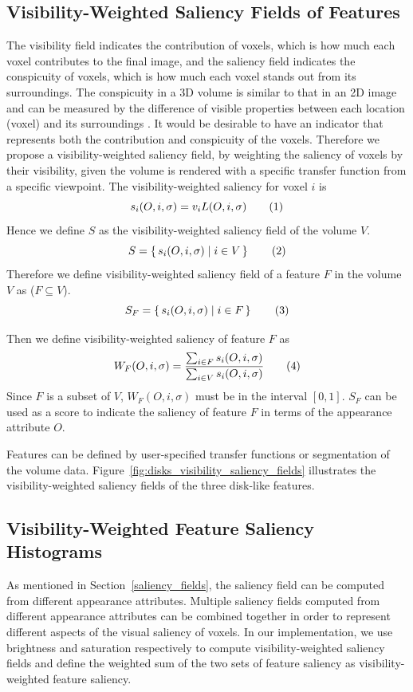 \subsection{Visibility-Weighted Saliency Fields of Features \label{visibility_weighted_saliency}}
The visibility field indicates the contribution of voxels, which is how much each voxel contributes to the final image, and the saliency field indicates the conspicuity of voxels, which is how much each voxel stands out from its surroundings.
The conspicuity in a 3D volume is similar to that in an 2D image and can be measured by the difference of visible properties between each location (voxel) and its surroundings \cite{duan_visual_2011}.
It would be desirable to have an indicator that represents both the contribution and conspicuity of the voxels.
Therefore we propose a visibility-weighted saliency field, by weighting the saliency of voxels by their visibility, given the volume is rendered with a specific transfer function from a specific viewpoint.
The visibility-weighted saliency for voxel $ i $ is
\[ s_{i}(O,i,\sigma)= v_{i} L(O,i,\sigma)
\addtag \]
Hence we define $ S $ as the visibility-weighted saliency field of the volume $ V $.
\[ S=\set{s_{i}(O,i,\sigma)|i \in V} 
\addtag \]
Therefore we define visibility-weighted saliency field of a feature $ F $ in the volume $ V $ as ($ F\subseteq V $).
\[ S_{F}=\set{s_{i}(O,i,\sigma)|i \in F} 
\addtag \]

Then we define visibility-weighted saliency of feature $ F $ as
\[ W_{F}(O,i,\sigma)=\frac{\sum_{i \in F}{s_{i}(O,i,\sigma)}}{\sum_{i \in V}{s_{i}(O,i,\sigma)}} 
\addtag \]
Since $ F $ is a subset of $ V $, $ W_{F}(O,i,\sigma) $ must be in the interval $ [0,1] $.
$ S_{F} $ can be used as a score to indicate the saliency of feature $ F $ in terms of the appearance attribute $ O $.

Features can be defined by user-specified transfer functions or segmentation of the volume data.
Figure~\ref{fig:disks_visibility_saliency_fields} illustrates the visibility-weighted saliency fields of the three disk-like features.

\subsection{Visibility-Weighted Feature Saliency Histograms \label{weighted_feature_saliency}}
As mentioned in Section~\ref{saliency_fields}, the saliency field can be computed from different appearance attributes.
Multiple saliency fields computed from different appearance attributes can be combined together in order to represent different aspects of the visual saliency of voxels.
In our implementation, we use brightness and saturation respectively to compute visibility-weighted saliency fields and define the weighted sum of the two sets of feature saliency as visibility-weighted feature saliency.

